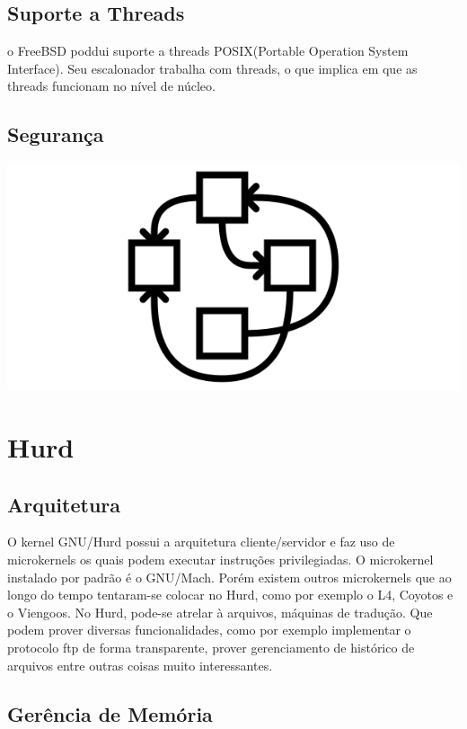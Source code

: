 \documentclass[conference]{IEEEtran}
\begin{document}
\subsection{Suporte a Threads}\label{sec:BSDThreads}
o FreeBSD poddui suporte a threads POSIX(Portable Operation System Interface). Seu escalonador trabalha com threads, o que implica em que as threads funcionam no nível de núcleo.\cite{DesignImplementationFreeBSD}

\subsection{Segurança}\label{sec:BSDSec}

\includegraphics[scale = 0.5]{Hurd.png}\\
\section{Hurd}\label{sec:Hurd}

\subsection{Arquitetura}\label{sec:HurdArq}
O kernel GNU/Hurd possui a arquitetura cliente/servidor e faz uso de microkernels os quais podem executar instruções privilegiadas. O microkernel instalado por padrão é o GNU/Mach. Porém existem outros microkernels que ao longo do tempo tentaram-se colocar no Hurd, como por exemplo o L4, Coyotos e o Viengoos. No Hurd, pode-se atrelar à arquivos, máquinas de tradução. Que podem prover diversas funcionalidades, como por exemplo implementar o protocolo ftp de forma transparente, prover gerenciamento de histórico de arquivos entre outras coisas muito interessantes.\cite{HurdPaper}

\subsection{Gerência de Memória}\label{sec:HurdMem}
\end{document}

